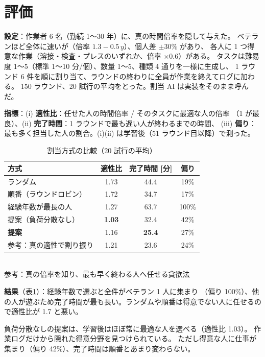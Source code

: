 \documentclass[a4paper,10pt,twocolumn,autodetect-engine,ja=standard]{bxjsarticle}
\begin{document}
\section{評価}
\textbf{設定}：作業者 6 名（勤続 1〜30 年）に、真の時間倍率を隠して与えた。
ベテランほど全体に速いが（倍率 $1.3 - 0.5\,y$）、個人差 $\pm 30\%$ があり、
各人に 1 つ得意な作業（溶接・検査・プレスのいずれか、倍率 $\times 0.6$）がある。
タスクは難易度 1〜5（標準 1〜10 分/個）、数量 1〜5、種類 4 通りを一様に生成し、
1 ラウンド 6 件を順に割り当て、ラウンドの終わりに全員が作業を終えてログに加わる。
150 ラウンド、20 試行の平均をとった。割当 AI は実装をそのまま呼んだ。

\textbf{指標}：(i) \textbf{適性比}：任せた人の時間倍率 / そのタスクに最適な人の倍率
（1 が最良）、(ii) \textbf{完了時間}：1 ラウンドで最も遅い人が終わるまでの時間、
(iii) \textbf{偏り}：最も多く担当した人の割合。(i)(ii) は学習後（51 ラウンド目以降）で測った。

\begin{table}[tb]
  \centering
  \caption{割当方式の比較（20 試行の平均）}
  \label{tab:result}
  \small
  \begin{tabular}{lccc}
    \toprule
    方式 & 適性比 & 完了時間 [分] & 偏り \\
    \midrule
    ランダム           & 1.73 & 44.4 & 19\% \\
    順番（ラウンドロビン） & 1.72 & 34.7 & 17\% \\
    経験年数が最長の人     & 1.27 & 63.7 & 100\% \\
    提案（負荷分散なし）   & \textbf{1.03} & 32.4 & 42\% \\
    \textbf{提案}         & 1.16 & \textbf{25.4} & 27\% \\
    \midrule
    参考：真の適性で割り振り  & 1.21 & 23.6 & 24\% \\
    \bottomrule
  \end{tabular}\\[2pt]
  {\footnotesize 参考：真の倍率を知り、最も早く終わる人へ任せる貪欲法}
\end{table}

\textbf{結果}（表\ref{tab:result}）：経験年数で選ぶと全件がベテラン 1 人に集まり
（偏り 100\%）、他の人が遊ぶため完了時間が最も長い。ランダムや順番は得意でない人に任せるので適性比が 1.7 と悪い。

負荷分散なしの提案は、学習後はほぼ常に最適な人を選べる（適性比 1.03）。
作業ログだけから隠れた得意分野を見つけられている。
ただし得意な人に仕事が集まり（偏り 42\%）、完了時間は順番とあまり変わらない。
\end{document}
